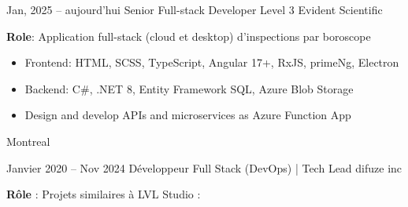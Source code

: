 \documentclass[
  a4paper,
   maincolor=cvblue,
   sectioncolor=cvblue,
   sidebarwidth=0.323\paperwidth,
]{fortysecondscv}
\begin{document}
\newpage
\restoregeometry
{}\paperwidth

\makefrontsidebar

\vspace*{-3.7em} %



\begin{cvtableNew}


  \cvitemRightNew
    {Jan, 2025 – aujourd’hui} %
    {Senior Full-stack Developer Level 3} %
    {Evident Scientific} %
    {
      \vspace{0.1pt} %
      \fontsize{10.8pt}{12pt}\selectfont %
      \textbf{Role}: Application full-stack (cloud et desktop) d’inspections par boroscope\vspace{4pt}
      \begin{itemize}[itemsep=-1mm, topsep=0pt, leftmargin=8pt]
        \item Frontend: HTML, SCSS, TypeScript, Angular 17+, RxJS, primeNg, Electron\vspace{5pt}
        \item Backend: C\#, .NET 8, Entity Framework SQL, Azure Blob Storage\vspace{5pt}
        \item Design and develop APIs and microservices as Azure Function App\vspace{5pt}
      \end{itemize}
    }
    {Montreal} %

    \vspace{1.6mm} %


  \cvitemRightNew
  {Janvier 2020 – Nov 2024} %
  {Développeur Full Stack (DevOps) | Tech Lead} %
  {difuze inc} %
  {
    \vspace{0.1pt}
    \fontsize{10.8pt}{12pt}\selectfont
    \textbf{Rôle} : Projets similaires à LVL Studio :\vspace{5pt}

}
\end{cvtableNew}
\end{document}
